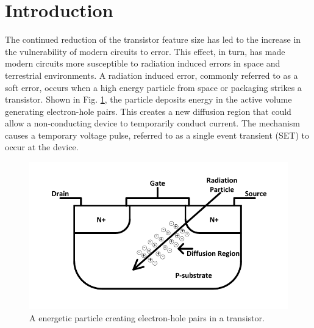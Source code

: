 

\chapter*{Introduction}

The continued reduction of the transistor feature size has led to the increase in the vulnerability of modern circuits to error. This effect, in turn, has made modern circuits more susceptible to radiation induced errors in space and terrestrial environments. A radiation induced error, commonly referred to as a soft error, occurs when a high energy particle from space or packaging strikes a transistor. Shown in Fig. \ref{strike}, the particle deposits energy in the active volume generating electron-hole pairs. This creates a new diffusion region that could allow a non-conducting device to temporarily conduct current. The mechanism causes a temporary voltage pulse, referred to as a single event transient (SET) to occur at the device.

\begin{figure}[!htbp]
	\centering
	\includegraphics[width=0.45\linewidth]{Figures/StrikeFig}
	\caption{A energetic particle creating electron-hole pairs in a transistor.}
	\label{strike}
\end{figure} 

